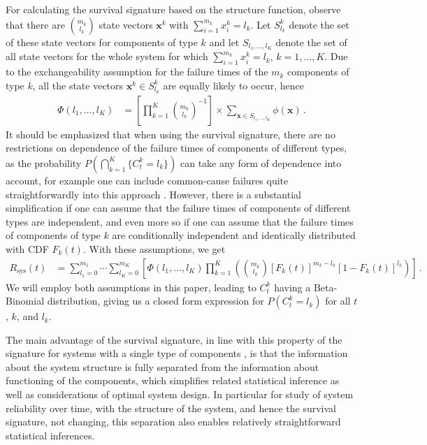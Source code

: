 \documentclass[12pt, a4paper]{elsarticle}
\newcommand{\bs}[1]{\boldsymbol{#1}}
\renewcommand{\vec}[1]{{\bs#1}}
\newcommand{\Rsys}{R_\text{sys}}
\def\Tsys{T_\text{sys}}
\begin{document}
For calculating the survival signature based on the structure function, observe that
there are $\binom{m_k}{l_k}$ state vectors $\vec{x}^k$ with $\sum_{i=1}^{m_k} x^k_i = l_k$. Let $S^k_{l_k}$ 
denote the set of these state vectors for components of type $k$ and let $S_{l_1,\ldots,l_K}$ denote the set of 
all state vectors for the whole system for which $\sum_{i=1}^{m_k} x^k_i = l_k$, $k=1,\ldots,K$. Due to the 
exchangeability assumption for the failure times of the $m_k$ components of type $k$, all the state vectors 
$\vec{x}^k \in S^k_{l_k}$ are equally likely to occur, hence \citep{2012:survsign}
\begin{align}
\label{eq:surv-sig}
\Phi(l_1,\ldots,l_K)
 &= \left[ \prod_{k=1}^K \binom{m_k}{l_k}^{-1} \right] \times \sum_{\vec{x} \in S_{l_1,\ldots,l_K}} \phi(\vec{x})\,.
\end{align}
%
It should be emphasized that when using the survival signature,
there are no restrictions on dependence of the failure times of components of different types,
as the probability $P(\bigcap_{k=1}^K \{C^k_t = l_k\})$ can take any form of dependence into account,
for example one can include common-cause failures quite straightforwardly into this approach \cite{CCM15}. %
However, there is a substantial simplification
if one can assume that the failure times of components of different types are independent,
and even more so if one can assume that the failure times of components of type $k$ 
are conditionally independent and identically distributed with CDF $F_k(t)$.
With these assumptions, we get
\begin{align*}
\Rsys(t) &= \sum_{l_1=0}^{m_1} \cdots \sum_{l_K=0}^{m_K} \left[ \Phi(l_1,\ldots,l_K)
            \prod_{k=1}^K \left( \binom{m_k}{l_k} [F_k(t)]^{m_k-l_k} [1-F_k(t)]^{l_k} \right) \right]\,.
\end{align*}
We will employ both assumptions in this paper,
leading to $C^k_t$ having a Beta-Binomial distribution,
giving us a closed form expression for $P(C^k_t = l_k)$ for all $t$, $k$, and $l_k$.

The main advantage of the survival signature, in line with this property of the signature for systems with a single type of 
components \citep{Sa07}, is that the information about the system structure is fully 
separated from the information about functioning of the components, which simplifies related statistical inference as well as
considerations of optimal system design. In particular for study of system reliability over time, with the structure of the system, 
and hence the survival signature, not changing, this separation also enables relatively straightforward statistical inferences. 
\end{document}

